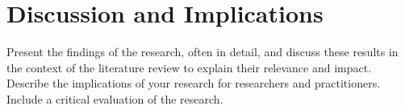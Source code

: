 \chapter{Discussion and Implications}
\label{ch:discussion}

Present the findings of the research, often in detail,
and discuss these results in the context of the literature review
to explain their relevance and impact.
Describe the implications of your research for researchers and practitioners.
Include a critical evaluation of the research.
